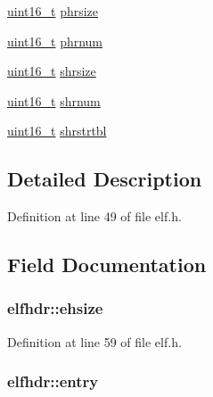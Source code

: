 \begin{DoxyCompactItemize}
\hyperlink{types_8h_a273cf69d639a59973b6019625df33e30}{uint16\-\_\-t} \hyperlink{structelfhdr_a25da2da02b100a32e10297ec10bb72b1}{phrsize}
\item 
\hyperlink{types_8h_a273cf69d639a59973b6019625df33e30}{uint16\-\_\-t} \hyperlink{structelfhdr_a71e741e84e2cc752e289cc8b7db9f97a}{phrnum}
\item 
\hyperlink{types_8h_a273cf69d639a59973b6019625df33e30}{uint16\-\_\-t} \hyperlink{structelfhdr_a90dfa1d488ee147b66fee113dc7d9230}{shrsize}
\item 
\hyperlink{types_8h_a273cf69d639a59973b6019625df33e30}{uint16\-\_\-t} \hyperlink{structelfhdr_aee30993babcc6987c3c428d58157e6cf}{shrnum}
\item 
\hyperlink{types_8h_a273cf69d639a59973b6019625df33e30}{uint16\-\_\-t} \hyperlink{structelfhdr_a45fd0b68634a61bf55618c95810aeecb}{shrstrtbl}
\end{DoxyCompactItemize}


\subsection{\-Detailed \-Description}


\-Definition at line 49 of file elf.\-h.



\subsection{\-Field \-Documentation}
\hypertarget{structelfhdr_ad75ebd2222fc338c6ea326e5fb540ad9}{
\subsubsection[{ehsize}]{ {\bf elfhdr\-::ehsize}}}\label{structelfhdr_ad75ebd2222fc338c6ea326e5fb540ad9}


\-Definition at line 59 of file elf.\-h.

\hypertarget{structelfhdr_a1d87fa5f4b71692c2371527ae88a825b}{
\subsubsection[{entry}]{ {\bf elfhdr\-::entry}}}\label{structelfhdr_a1d87fa5f4b71692c2371527ae88a825b}



